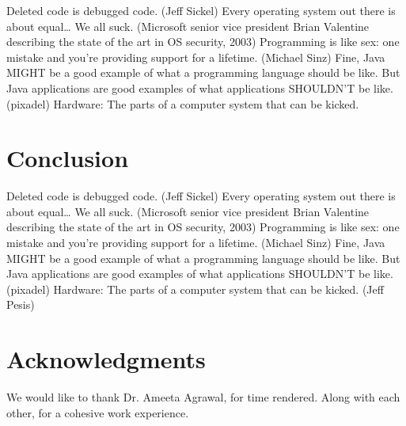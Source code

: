 \documentclass[11pt,a4paper]{article}
\begin{document}
Deleted code is debugged code. (Jeff Sickel) Every operating system out there is about equal… We all suck. (Microsoft senior vice president Brian Valentine describing the state of the art in OS security, 2003) Programming is like sex: one mistake and you’re providing support for a lifetime. (Michael Sinz) Fine, Java MIGHT be a good example of what a programming language should be like. But Java applications are good examples of what applications SHOULDN’T be like. (pixadel) Hardware: The parts of a computer system that can be kicked. 

\section{Conclusion}

Deleted code is debugged code. (Jeff Sickel) Every operating system out there is about equal… We all suck. (Microsoft senior vice president Brian Valentine describing the state of the art in OS security, 2003) Programming is like sex: one mistake and you’re providing support for a lifetime. (Michael Sinz) Fine, Java MIGHT be a good example of what a programming language should be like. But Java applications are good examples of what applications SHOULDN’T be like. (pixadel) Hardware: The parts of a computer system that can be kicked. (Jeff Pesis)

\section*{Acknowledgments}

We would like to thank Dr. Ameeta Agrawal, for time rendered. Along with each other, for a cohesive work experience. 

\nocite{*} 
\printbibliography[title={Bibliography}] 

%
%

\end{document}
